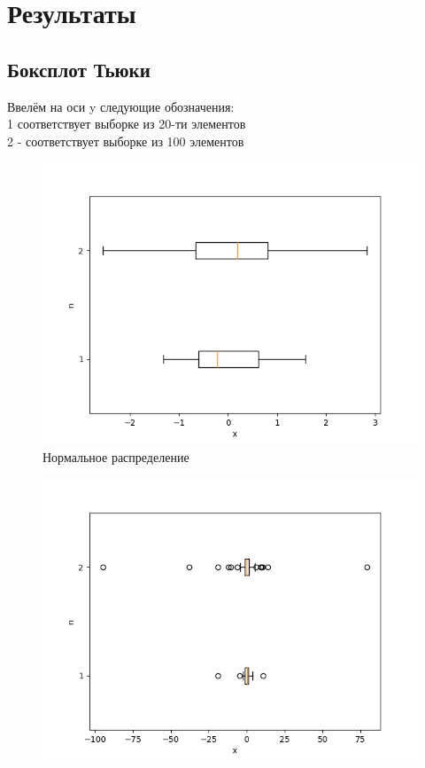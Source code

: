 \documentclass[a4]{article}
\begin{document}
	\section{Результаты}
		\subsection{Боксплот Тьюки}
		Ввелём на оси y следующие обозначения:\\
		1 соответствует выборке из 20-ти элементов\\
		2 - соответствует выборке из 100 элементов\\
			\begin{center}
				
				\begin{figure}[h]
					\includegraphics[width=\textwidth]{normal.png} 
					\caption[Нормальное распределение]{Нормальное распределение}
				\end{figure}
				\newpage
				\begin{figure}[h]
					\includegraphics[width=\textwidth]{cauchy.png}

\end{figure}
\end{center}
\end{document}
